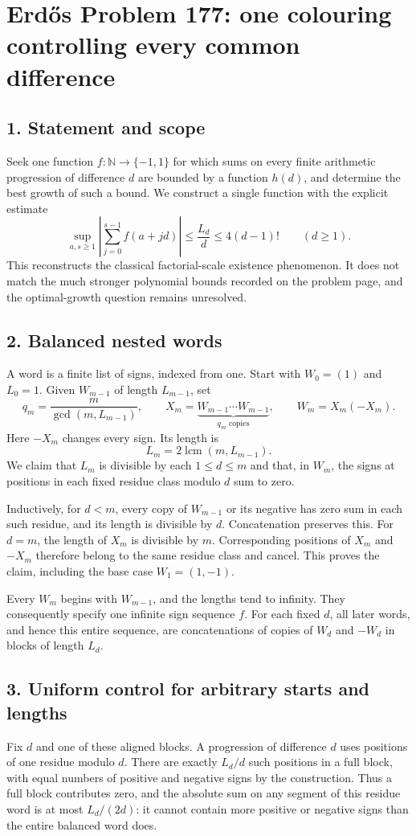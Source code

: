 \section*{Erd\H{o}s Problem 177: one colouring controlling every common difference}

\subsection*{1. Statement and scope}
Seek one function $f:\mathbb N\to\{-1,1\}$ for which sums on every finite arithmetic progression of difference $d$ are bounded by a function $h(d)$, and determine the best growth of such a bound. We construct a single function with the explicit estimate
\[
 \sup_{a,s\ge1}\left|\sum_{j=0}^{s-1}f(a+jd)\right|
 \le\frac{L_d}{d}\le4(d-1)!\qquad(d\ge1).\tag{1}
\]
This reconstructs the classical factorial-scale existence phenomenon. It does not match the much stronger polynomial bounds recorded on the problem page, and the optimal-growth question remains unresolved.

\subsection*{2. Balanced nested words}
A word is a finite list of signs, indexed from one. Start with $W_0=(1)$ and $L_0=1$. Given $W_{m-1}$ of length $L_{m-1}$, set
\[
 q_m=\frac{m}{\gcd(m,L_{m-1})},\qquad
 X_m=\underbrace{W_{m-1}\cdots W_{m-1}}_{q_m\text{ copies}},
 \qquad W_m=X_m(-X_m).
\]
Here $-X_m$ changes every sign. Its length is
\[
 L_m=2\operatorname{lcm}(m,L_{m-1}).\tag{2}
\]
We claim that $L_m$ is divisible by each $1\le d\le m$ and that, in $W_m$, the signs at positions in each fixed residue class modulo $d$ sum to zero.

Inductively, for $d<m$, every copy of $W_{m-1}$ or its negative has zero sum in each such residue, and its length is divisible by $d$. Concatenation preserves this. For $d=m$, the length of $X_m$ is divisible by $m$. Corresponding positions of $X_m$ and $-X_m$ therefore belong to the same residue class and cancel. This proves the claim, including the base case $W_1=(1,-1)$.

Every $W_m$ begins with $W_{m-1}$, and the lengths tend to infinity. They consequently specify one infinite sign sequence $f$. For each fixed $d$, all later words, and hence this entire sequence, are concatenations of copies of $W_d$ and $-W_d$ in blocks of length $L_d$.

\subsection*{3. Uniform control for arbitrary starts and lengths}
Fix $d$ and one of these aligned blocks. A progression of difference $d$ uses positions of one residue modulo $d$. There are exactly $L_d/d$ such positions in a full block, with equal numbers of positive and negative signs by the construction. Thus a full block contributes zero, and the absolute sum on any segment of this residue word is at most $L_d/(2d)$: it cannot contain more positive or negative signs than the entire balanced word does.

